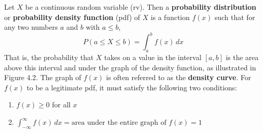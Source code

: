 \documentclass{report}
\begin{document}
 \begin{remark}
     Let $X$ be a continuous random variable (rv). Then a \textbf{probability distribution} or \textbf{probability density function} (pdf) of $X$ is a function $f(x)$ such that for any two numbers $a$ and $b$ with $a \leq b$,
     \[
         P(a \leq X \leq b) = \int_{a}^{b} f(x) \, dx
     \]
     That is, the probability that $X$ takes on a value in the interval $[a, b]$ is the area above this interval and under the graph of the density function, as illustrated in Figure 4.2. The graph of $f(x)$ is often referred to as the \textbf{density curve}. 
     For $f(x)$ to be a legitimate pdf, it must satisfy the following two conditions:
     \begin{enumerate}
         \item $f(x) \geq 0$ for all $x$
         \item $\int_{-\infty}^{\infty} f(x) \, dx = \text{area under the entire graph of } f(x) = 1$
     \end{enumerate} \smiley{}

 \end{remark}
\end{document}
